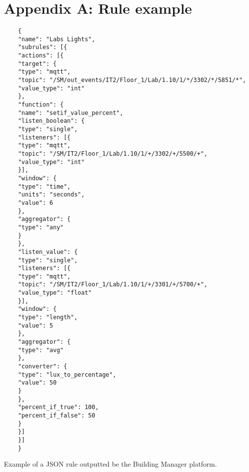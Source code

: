 \chapter{Appendix A: Rule example}
\label{chapter:appendix-a}

\begin{listing}[H]
	\begin{verbatim}
	{
	"name": "Labs Lights",
	"subrules": [{
	"actions": [{
	"target": {
	"type": "mqtt",
	"topic": "/SM/out_events/IT2/Floor_1/Lab/1.10/1/*/3302/*/5851/*",
	"value_type": "int"
	},
	"function": {
	"name": "setif_value_percent",
	"listen_boolean": {
	"type": "single",
	"listeners": [{
	"type": "mqtt",
	"topic": "/SM/IT2/Floor_1/Lab/1.10/1/+/3302/+/5500/+",
	"value_type": "int"
	}],
	"window": {
	"type": "time",
	"units": "seconds",
	"value": 6
	},
	"aggregator": {
	"type": "any"
	}
	},
	"listen_value": {
	"type": "single",
	"listeners": [{
	"type": "mqtt",
	"topic": "/SM/IT2/Floor_1/Lab/1.10/1/+/3301/+/5700/+",
	"value_type": "float"
	}],
	"window": {
	"type": "length",
	"value": 5
	},
	"aggregator": {
	"type": "avg"
	},
	"converter": {
	"type": "lux_to_percentage",
	"value": 50
	}
	},
	"percent_if_true": 100,
	"percent_if_false": 50
	}
	}]
	}]
	}
	\end{verbatim}
	\caption{Example of a JSON rule outputted be the Building Manager platform.}
	\label{snip:rule}
\end{listing}
